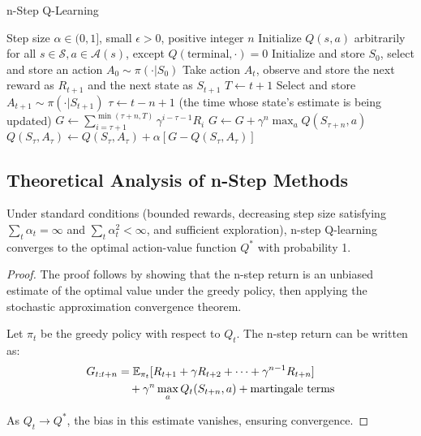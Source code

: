 \begin{algorithm}
\caption{n-Step Q-Learning}
\begin{algorithmic}
\REQUIRE Step size $\alpha \in (0,1]$, small $\epsilon > 0$, positive integer $n$
\STATE Initialize $Q(s,a)$ arbitrarily for all $s \in \mathcal{S}, a \in \mathcal{A}(s)$, except $Q(\text{terminal}, \cdot) = 0$
\STATE Initialize and store $S_0$, select and store an action $A_0 \sim \pi(\cdot|S_0)$
        \STATE Take action $A_t$, observe and store the next reward as $R_{t+1}$ and the next state as $S_{t+1}$
            \STATE $T \leftarrow t + 1$
        \ELSE
            \STATE Select and store $A_{t+1} \sim \pi(\cdot|S_{t+1})$
        \ENDIF
    \ENDIF
    \STATE $\tau \leftarrow t - n + 1$ (the time whose state's estimate is being updated)
        \STATE $G \leftarrow \sum_{i=\tau+1}^{\min(\tau+n, T)} \gamma^{i-\tau-1} R_i$
            \STATE $G \leftarrow G + \gamma^n \max_a Q(S_{\tau+n}, a)$
        \ENDIF
        \STATE $Q(S_\tau, A_\tau) \leftarrow Q(S_\tau, A_\tau) + \alpha [G - Q(S_\tau, A_\tau)]$
    \ENDIF
\ENDFOR
\end{algorithmic}
\end{algorithm}

\subsection{Theoretical Analysis of n-Step Methods}

\begin{theorem}
Under standard conditions (bounded rewards, decreasing step size satisfying $\sum_t \alpha_t = \infty$ and $\sum_t \alpha_t^2 < \infty$, and sufficient exploration), n-step Q-learning converges to the optimal action-value function $Q^*$ with probability 1.
\end{theorem}

\begin{proof}
The proof follows by showing that the n-step return is an unbiased estimate of the optimal value under the greedy policy, then applying the stochastic approximation convergence theorem.

Let $\pi_t$ be the greedy policy with respect to $Q_t$. The n-step return can be written as:
\begin{align}
G_{t:t+n} &= \mathbb{E}_{\pi_t}[R_{t+1} + \gamma R_{t+2} + \cdots + \gamma^{n-1} R_{t+n}] \\
&\quad + \gamma^n \max_a Q_t(S_{t+n}, a) + \text{martingale terms}
\end{align}

As $Q_t \to Q^*$, the bias in this estimate vanishes, ensuring convergence.
\end{proof}

